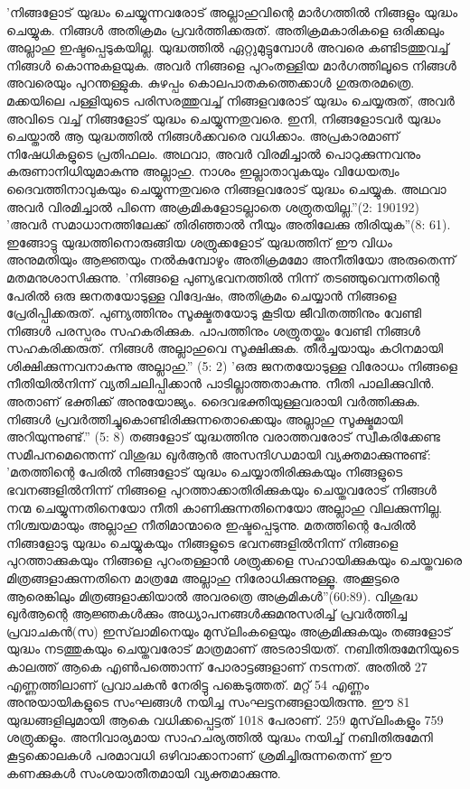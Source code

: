 'നിങ്ങളോട് യുദ്ധം ചെയ്യുന്നവരോട് അല്ലാഹുവിന്റെ മാര്‍ഗത്തില്‍ നിങ്ങളും യുദ്ധം ചെയ്യുക. നിങ്ങള്‍ അതിക്രമം പ്രവര്‍ത്തിക്കരുത്. അതിക്രമകാരികളെ ഒരിക്കലും അല്ലാഹു ഇഷ്ടപ്പെടുകയില്ല. യുദ്ധത്തില്‍ ഏറ്റുമുട്ടുമ്പോള്‍ അവരെ കണ്ടിടത്തുവച്ച് നിങ്ങള്‍ കൊന്നുകളയുക. അവര്‍ നിങ്ങളെ പുറംതള്ളിയ മാര്‍ഗത്തിലൂടെ നിങ്ങള്‍ അവരെയും പുറന്തള്ളുക. കുഴപ്പം കൊലപാതകത്തെക്കാള്‍ ഗുരുതരമത്രെ. മക്കയിലെ പള്ളിയുടെ പരിസരത്തുവച്ച് നിങ്ങളവരോട് യുദ്ധം ചെയ്യരുത്, അവര്‍ അവിടെ വച്ച് നിങ്ങളോട് യുദ്ധം ചെയ്യുന്നതുവരെ. ഇനി, നിങ്ങളോടവര്‍ യുദ്ധം ചെയ്താല്‍ ആ യുദ്ധത്തില്‍ നിങ്ങള്‍ക്കവരെ വധിക്കാം. അപ്രകാരമാണ് നിഷേധികളുടെ പ്രതിഫലം. അഥവാ, അവര്‍ വിരമിച്ചാല്‍ പൊറുക്കുന്നവനും കരുണാനിധിയുമാകുന്നു അല്ലാഹു. നാശം ഇല്ലാതാവുകയും വിധേയത്വം ദൈവത്തിനാവുകയും ചെയ്യുന്നതുവരെ നിങ്ങളവരോട് യുദ്ധം ചെയ്യുക. അഥവാ അവര്‍ വിരമിച്ചാല്‍ പിന്നെ അക്രമികളോടല്ലാതെ ശത്രുതയില്ല.''(2: 190192)
'അവര്‍ സമാധാനത്തിലേക്ക് തിരിഞ്ഞാല്‍ നീയും അതിലേക്കു തിരിയുക''(8: 61). ഇങ്ങോട്ടു യുദ്ധത്തിനൊരുങ്ങിയ ശത്രുക്കളോട് യുദ്ധത്തിന് ഈ വിധം അനുമതിയും ആജ്ഞയും നല്‍കുമ്പോഴും അതിക്രമമോ അനീതിയോ അരുതെന്ന് മതമനുശാസിക്കുന്നു. 'നിങ്ങളെ പുണ്യഭവനത്തില്‍ നിന്ന് തടഞ്ഞുവെന്നതിന്റെ പേരില്‍ ഒരു ജനതയോടുള്ള വിദ്വേഷം, അതിക്രമം ചെയ്യാന്‍ നിങ്ങളെ പ്രേരിപ്പിക്കരുത്. പുണ്യത്തിനും സൂക്ഷ്മതയോടു കൂടിയ ജീവിതത്തിനും വേണ്ടി നിങ്ങള്‍ പരസ്പരം സഹകരിക്കുക. പാപത്തിനും ശത്രുതയ്ക്കും വേണ്ടി നിങ്ങള്‍ സഹകരിക്കരുത്. നിങ്ങള്‍ അല്ലാഹുവെ സൂക്ഷിക്കുക. തീര്‍ച്ചയായും കഠിനമായി ശിക്ഷിക്കുന്നവനാകുന്നു അല്ലാഹു.'' (5: 2)
'ഒരു ജനതയോടുള്ള വിരോധം നിങ്ങളെ നീതിയില്‍നിന്ന് വ്യതിചലിപ്പിക്കാന്‍ പാടില്ലാത്തതാകുന്നു. നീതി പാലിക്കുവിന്‍. അതാണ് ഭക്തിക്ക് അനുയോജ്യം. ദൈവഭക്തിയുള്ളവരായി വര്‍ത്തിക്കുക. നിങ്ങള്‍ പ്രവര്‍ത്തിച്ചുകൊണ്ടിരിക്കുന്നതൊക്കെയും അല്ലാഹു സൂക്ഷ്മമായി അറിയുന്നുണ്ട്.'' (5: 8)
തങ്ങളോട് യുദ്ധത്തിനു വരാത്തവരോട് സ്വീകരിക്കേണ്ട സമീപനമെന്തെന്ന് വിശുദ്ധ ഖുര്‍ആന്‍ അസന്ദിഗ്ധമായി വ്യക്തമാക്കുന്നുണ്ട്: 'മതത്തിന്റെ പേരില്‍ നിങ്ങളോട് യുദ്ധം ചെയ്യാതിരിക്കുകയും നിങ്ങളുടെ ഭവനങ്ങളില്‍നിന്ന് നിങ്ങളെ പുറത്താക്കാതിരിക്കുകയും ചെയ്തവരോട് നിങ്ങള്‍ നന്മ ചെയ്യുന്നതിനെയോ നീതി കാണിക്കുന്നതിനെയോ അല്ലാഹു വിലക്കുന്നില്ല. നിശ്ചയമായും അല്ലാഹു നീതിമാന്മാരെ ഇഷ്ടപ്പെടുന്നു. മതത്തിന്റെ പേരില്‍ നിങ്ങളോടു യുദ്ധം ചെയ്യുകയും നിങ്ങളുടെ ഭവനങ്ങളില്‍നിന്ന് നിങ്ങളെ പുറത്താക്കുകയും നിങ്ങളെ പുറംതള്ളാന്‍ ശത്രുക്കളെ സഹായിക്കുകയും ചെയ്തവരെ മിത്രങ്ങളാക്കുന്നതിനെ മാത്രമേ അല്ലാഹു നിരോധിക്കുന്നുള്ളൂ. അക്കൂട്ടരെ ആരെങ്കിലും മിത്രങ്ങളാക്കിയാല്‍ അവരത്രെ അക്രമികള്‍''(60:89).
വിശുദ്ധ ഖുര്‍ആന്റെ ആജ്ഞകള്‍ക്കും അധ്യാപനങ്ങള്‍ക്കുമനുസരിച്ച് പ്രവര്‍ത്തിച്ച പ്രവാചകന്‍(സ) ഇസ്‌ലാമിനെയും മുസ്‌ലിംകളെയും അക്രമിക്കുകയും തങ്ങളോട് യുദ്ധം നടത്തുകയും ചെയ്തവരോട് മാത്രമാണ് അടരാടിയത്. നബിതിരുമേനിയുടെ കാലത്ത് ആകെ എണ്‍പത്തൊന്ന് പോരാട്ടങ്ങളാണ് നടന്നത്. അതില്‍ 27 എണ്ണത്തിലാണ് പ്രവാചകന്‍ നേരിട്ടു പങ്കെടുത്തത്. മറ്റ് 54 എണ്ണം അനുയായികളുടെ സംഘങ്ങള്‍ നയിച്ച സംഘട്ടനങ്ങളായിരുന്നു. ഈ 81 യുദ്ധങ്ങളിലുമായി ആകെ വധിക്കപ്പെട്ടത് 1018 പേരാണ്. 259 മുസ്‌ലിംകളും 759 ശത്രുക്കളും. അനിവാര്യമായ സാഹചര്യത്തില്‍ യുദ്ധം നയിച്ച് നബിതിരുമേനി കൂട്ടക്കൊലകള്‍ പരമാവധി ഒഴിവാക്കാനാണ് ശ്രമിച്ചിരുന്നതെന്ന് ഈ കണക്കുകള്‍ സംശയാതീതമായി വ്യക്തമാക്കുന്നു.
